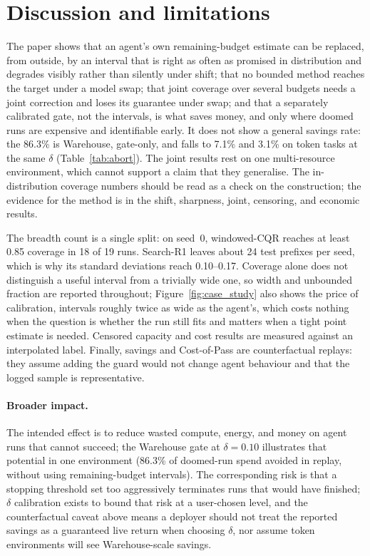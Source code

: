 \flushbottom
\section{Discussion and limitations}
\label{sec:discussion}

The paper shows that an agent's own remaining-budget estimate can be replaced, from outside, by an interval that is right as often as promised in distribution and degrades visibly rather than silently under shift; that no bounded method reaches the target under a model swap; that joint coverage over several budgets needs a joint correction and loses its guarantee under swap; and that a separately calibrated gate, not the intervals, is what saves money, and only where doomed runs are expensive and identifiable early. It does not show a general savings rate: the 86.3\% is Warehouse, gate-only, and falls to 7.1\% and 3.1\% on token tasks at the same $\delta$ (Table~\ref{tab:abort}). The joint results rest on one multi-resource environment, which cannot support a claim that they generalise. The in-distribution coverage numbers should be read as a check on the construction; the evidence for the method is in the shift, sharpness, joint, censoring, and economic results.

The breadth count is a single split: on seed~0, windowed-CQR reaches at least 0.85 coverage in 18 of 19 runs. Search-R1 leaves about 24 test prefixes per seed, which is why its standard deviations reach 0.10--0.17. Coverage alone does not distinguish a useful interval from a trivially wide one, so width and unbounded fraction are reported throughout; Figure~\ref{fig:case_study} also shows the price of calibration, intervals roughly twice as wide as the agent's, which costs nothing when the question is whether the run still fits and matters when a tight point estimate is needed. Censored capacity and cost results are measured against an interpolated label. Finally, savings and Cost-of-Pass are counterfactual replays: they assume adding the guard would not change agent behaviour and that the logged sample is representative.

\paragraph{Broader impact.}
The intended effect is to reduce wasted compute, energy, and money on agent runs that cannot succeed; the Warehouse gate at $\delta{=}0.10$ illustrates that potential in one environment (86.3\% of doomed-run spend avoided in replay, without using remaining-budget intervals). The corresponding risk is that a stopping threshold set too aggressively terminates runs that would have finished; $\delta$ calibration exists to bound that risk at a user-chosen level, and the counterfactual caveat above means a deployer should not treat the reported savings as a guaranteed live return when choosing $\delta$, nor assume token environments will see Warehouse-scale savings.

